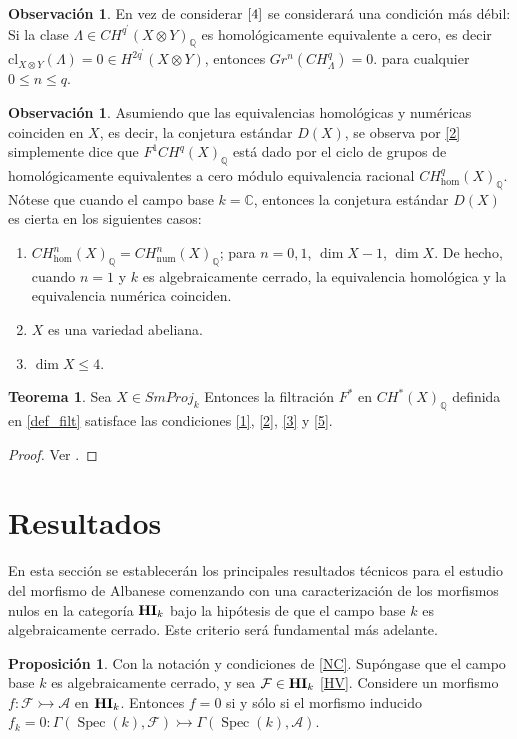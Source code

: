 \documentclass[10pt]{amsart}
\theoremstyle{definition}
\newtheorem{obs}[definition]{Observaci\'on}
\newtheorem{theorem}[definition]{Teorema}
\newtheorem{proposition}[definition]{Proposici\'on}
\theoremstyle{remark}
\theoremstyle{definition}
\begin{document}
\begin{obs} En vez de considerar $\ref{4}$ se considerará una condición más débil: Si la clase $\Lambda \in CH^{q^\prime}(X \otimes Y)_{\mathbb{Q}}$ es homol\'ogicamente equivalente a cero, es decir $\mathrm{cl}_{X \otimes Y}(\Lambda)=0 \in H^{2q^\prime}(X \otimes Y)$, entonces $Gr^{n}(CH^{q}_{\Lambda})=0$. para cualquier $0 \leq n \leq q$.
\end{obs}

\begin{obs} Asumiendo que las equivalencias homológicas y numéricas coinciden en $X$, es decir, la conjetura estándar $D(X)$, se observa por \ref{2} simplemente dice que $F^{1}CH^{q}(X)_{\mathbb{Q}}$ está dado por el ciclo de grupos de homológicamente equivalentes a cero módulo equivalencia racional $CH^{q}_{\mathrm{hom}}(X)_{\mathbb{Q}}$. Nótese que cuando el campo base $\mathit{k}=\mathbb{C}$, entonces la conjetura estándar $D(X)$ es cierta en los siguientes casos:
\begin{enumerate}
\item $CH^{n}_{\mathrm{hom}}(X)_{\mathbb{Q}}=CH^{n}_{\mathrm{num}}(X)_{\mathbb{Q}}$; para $n=0,1$, $\dim X -1$, $\dim X$. De hecho, cuando $n=1$ y $\mathit{k}$ es algebraicamente cerrado, la equivalencia homológica y la equivalencia numérica coinciden.
\item $X$ es una variedad abeliana.
\item $\dim X \leq 4$.
\end{enumerate}
\end{obs}

\begin{theorem} Sea $X \in SmProj_{\mathit{k}}$ Entonces la filtración $F^{*}$ en $CH^{*}(X)_{\mathbb{Q}}$ definida en \ref{def_filt} satisface las condiciones \ref{1}, \ref{2}, \ref{3} y \ref{5}.
\end{theorem}

\begin{proof}
Ver \cite[Thm. 6.1.4]{Pel17}.
\end{proof}

\newpage

\section{Resultados}
En esta sección se establecerán los principales resultados técnicos para el estudio del morfismo de Albanese comenzando con una caracterización de los morfismos nulos en la categoría  ${\bf HI}_{k}$ bajo la hipótesis de que el campo base $k$ es algebraicamente cerrado. Este criterio será fundamental más adelante.
\begin{proposition}\label{NC1}
Con la notación y condiciones de \ref{NC}. Supóngase que el campo base $k$ es algebraicamente cerrado, y sea $\mathcal{F}\in{\bf HI}_{k}$ \ref{HV}. Considere un morfismo $f:\mathcal{F}\rightarrowtail\mathcal{A}$ en ${\bf HI}_{k}$. Entonces $f=0$ si y sólo si el morfismo inducido $f_{k}=0:\Gamma(\operatorname{Spec}(k),\mathcal{F})\rightarrowtail\Gamma(\operatorname{Spec}(k),\mathcal{A})$.
\end{proposition}
\end{document}
